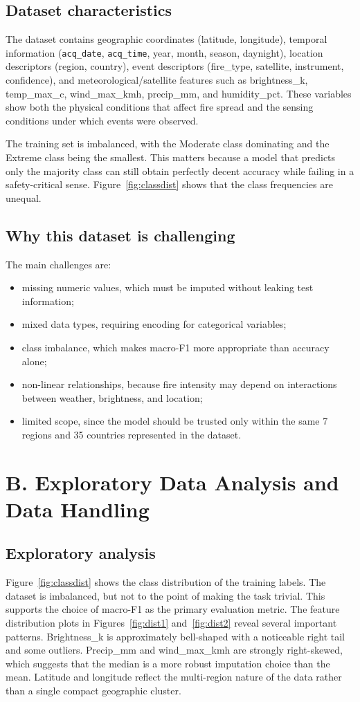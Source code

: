 \documentclass[11pt,a4paper]{article}
\begin{document}
\subsection{Dataset characteristics}
The dataset contains geographic coordinates (latitude, longitude), temporal information (\texttt{acq\_date}, \texttt{acq\_time}, year, month, season, daynight), location descriptors (region, country), event descriptors (fire\_type, satellite, instrument, confidence), and meteorological/satellite features such as brightness\_k, temp\_max\_c, wind\_max\_kmh, precip\_mm, and humidity\_pct. These variables show both the physical conditions that affect fire spread and the sensing conditions under which events were observed.

The training set is imbalanced, with the Moderate class dominating and the Extreme class being the smallest. This matters because a model that predicts only the majority class can still obtain perfectly decent accuracy while failing in a safety-critical sense. Figure~\ref{fig:classdist} shows that the class frequencies are unequal.

\subsection{Why this dataset is challenging}
The main challenges are:
\begin{itemize}
	\item missing numeric values, which must be imputed without leaking test information;
	\item mixed data types, requiring encoding for categorical variables;
	\item class imbalance, which makes macro-F1 more appropriate than accuracy alone;
	\item non-linear relationships, because fire intensity may depend on interactions between weather, brightness, and location;
	\item limited scope, since the model should be trusted only within the same 7 regions and 35 countries represented in the dataset.
\end{itemize}

\section{B. Exploratory Data Analysis and Data Handling}
\subsection{Exploratory analysis}
Figure~\ref{fig:classdist} shows the class distribution of the training labels. The dataset is imbalanced, but not to the point of making the task trivial. This supports the choice of macro-F1 as the primary evaluation metric. The feature distribution plots in Figures~\ref{fig:dist1} and~\ref{fig:dist2} reveal several important patterns. Brightness\_k is approximately bell-shaped with a noticeable right tail and some outliers. Precip\_mm and wind\_max\_kmh are strongly right-skewed, which suggests that the median is a more robust imputation choice than the mean. Latitude and longitude reflect the multi-region nature of the data rather than a single compact geographic cluster.
\end{document}
